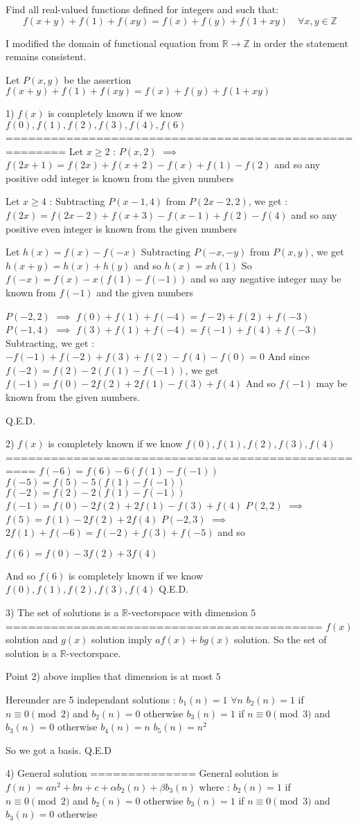 \begin{solution}
	\begin{tcolorbox}Find all real-valued functions defined for integers and such that:
\[f (x + y) + f (1) + f (xy) = f (x) + f (y) + f (1 + xy)\quad \forall x,y\in\mathbb{Z}\]\end{tcolorbox}
I modified the domain of functional equation from $\mathbb R\to\mathbb Z$ in order the statement remains consistent.

Let $P(x,y)$ be the assertion $f(x+y)+f(1)+f(xy)=f(x)+f(y)+f(1+xy)$

1) $f(x)$ is completely known if we know $f(0),f(1),f(2),f(3),f(4),f(6)$
======================================================
Let $x\ge 2$ :
$P(x,2)$ $\implies$ $f(2x+1)=f(2x)+f(x+2)-f(x)+f(1)-f(2)$ and so any positive odd integer is known from the given numbers

Let $x\ge 4$ :
Subtracting $P(x-1,4)$ from $P(2x-2,2)$, we get : $f(2x)=f(2x-2)+f(x+3)-f(x-1)+f(2)-f(4)$ and so any positive even integer is known from the given numbers

Let $h(x)=f(x)-f(-x)$
Subtracting $P(-x,-y)$ from $P(x,y)$, we get $h(x+y)=h(x)+h(y)$ and so $h(x)=xh(1)$
So $f(-x)=f(x)-x(f(1)-f(-1))$ and so any negative integer may be known from $f(-1)$ and the given numbers

$P(-2,2)$ $\implies$ $f(0)+f(1)+f(-4)=f-2)+f(2)+f(-3)$
$P(-1,4)$ $\implies$ $f(3)+f(1)+f(-4)=f(-1)+f(4)+f(-3)$
Subtracting, we get : $-f(-1)+f(-2)+f(3)+f(2)-f(4)-f(0)=0$
And since $f(-2)=f(2)-2(f(1)-f(-1))$, we get $f(-1)=f(0)-2f(2)+2f(1)-f(3)+f(4)$
And so $f(-1)$ may be known from the given numbers.

Q.E.D.

2) $f(x)$ is completely known if we know $f(0),f(1),f(2),f(3),f(4)$
==================================================
$f(-6)=f(6)-6(f(1)-f(-1))$
$f(-5)=f(5)-5(f(1)-f(-1))$
$f(-2)=f(2)-2(f(1)-f(-1))$
$f(-1)=f(0)-2f(2)+2f(1)-f(3)+f(4)$
$P(2,2)$ $\implies$ $f(5)=f(1)-2f(2)+2f(4)$
$P(-2,3)$ $\implies$ $2f(1)+f(-6)=f(-2)+f(3)+f(-5)$ and so 

$f(6)=f(0)-3f(2)+3f(4)$

And so $f(6)$ is completely known if we know $f(0),f(1),f(2),f(3),f(4)$
Q.E.D.


3) The set of solutions is a $\mathbb R$-vectorspace with dimension $5$
==========================================
$f(x)$ solution and $g(x)$ solution imply $af(x)+bg(x)$ solution. So the set of solution is a $\mathbb R$-vectorspace.

Point 2) above implies that dimension is at most $5$

Hereunder are 5 independant solutions :
$b_1(n)=1$ $\forall n$
$b_2(n)=1$ if $n\equiv 0\pmod 2$ and $b_2(n)=0$ otherwise
$b_3(n)=1$ if $n\equiv 0\pmod 3$ and $b_3(n)=0$ otherwise
$b_4(n)=n$
$b_5(n)=n^2$

So we got a basis.
Q.E.D

4) General solution
==============
General solution is $\boxed{f(n)=an^2+bn+c+\alpha b_2(n)+\beta b_3(n)}$ where :
$b_2(n)=1$ if $n\equiv 0\pmod 2$ and $b_2(n)=0$ otherwise
$b_3(n)=1$ if $n\equiv 0\pmod 3$ and $b_3(n)=0$ otherwise
\end{solution}
